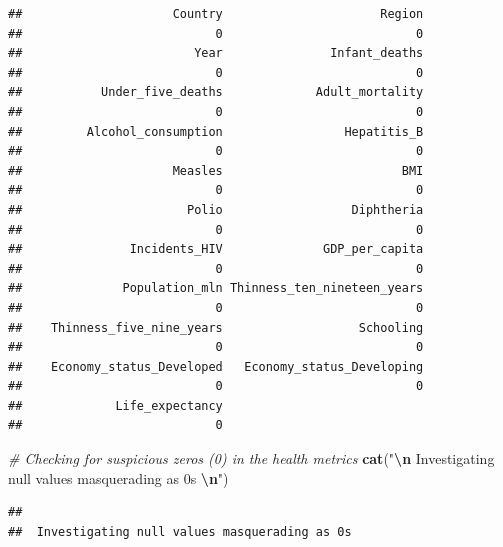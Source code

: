 \documentclass[
  10pt,
]{article}
\newenvironment{Shaded}{\begin{snugshade}}{\end{snugshade}}
\newcommand{\AttributeTok}[1]{\textcolor[rgb]{0.13,0.29,0.53}{#1}}
\newcommand{\CommentTok}[1]{\textcolor[rgb]{0.56,0.35,0.01}{\textit{#1}}}
\newcommand{\ConstantTok}[1]{\textcolor[rgb]{0.56,0.35,0.01}{#1}}
\newcommand{\DecValTok}[1]{\textcolor[rgb]{0.00,0.00,0.81}{#1}}
\newcommand{\FunctionTok}[1]{\textcolor[rgb]{0.13,0.29,0.53}{\textbf{#1}}}
\newcommand{\NormalTok}[1]{#1}
\newcommand{\SpecialCharTok}[1]{\textcolor[rgb]{0.81,0.36,0.00}{\textbf{#1}}}
\newcommand{\StringTok}[1]{\textcolor[rgb]{0.31,0.60,0.02}{#1}}
\begin{document}
\begin{verbatim}
##                     Country                      Region 
##                           0                           0 
##                        Year               Infant_deaths 
##                           0                           0 
##           Under_five_deaths             Adult_mortality 
##                           0                           0 
##         Alcohol_consumption                 Hepatitis_B 
##                           0                           0 
##                     Measles                         BMI 
##                           0                           0 
##                       Polio                  Diphtheria 
##                           0                           0 
##               Incidents_HIV              GDP_per_capita 
##                           0                           0 
##              Population_mln Thinness_ten_nineteen_years 
##                           0                           0 
##    Thinness_five_nine_years                   Schooling 
##                           0                           0 
##    Economy_status_Developed   Economy_status_Developing 
##                           0                           0 
##             Life_expectancy 
##                           0
\end{verbatim}

\begin{Shaded}
\begin{Highlighting}[]
\CommentTok{\# Checking for suspicious zeros (0) in the health metrics}
\FunctionTok{cat}\NormalTok{(}\StringTok{"}\SpecialCharTok{\textbackslash{}n}\StringTok{ Investigating null values masquerading as 0s }\SpecialCharTok{\textbackslash{}n}\StringTok{"}\NormalTok{)}
\end{Highlighting}
\end{Shaded}

\begin{verbatim}
## 
##  Investigating null values masquerading as 0s
\end{verbatim}

\begin{Shaded}
\end{Shaded}
\end{document}
